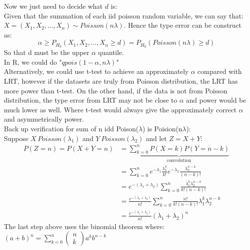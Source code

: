 \documentclass[12pt ]{article}
\newcommand{\RomanNumeralCaps}[1] {\MakeUppercase{\romannumeral #1}}
\begin{document}
\noindent
Now we just need to decide what $d$ is: \\
Given that the summation of each iid poisson random variable, we can say that: $X = (X_{1}, X_{2}, \ldots, X_{n}) \sim Poisson(n\lambda)$. Hence the type \RomanNumeralCaps{1} error can be construct as:
\begin{equation*}
\alpha \geq P_{H_{0}}(X_{1}, X_{2}, \ldots, X_{n} \geq d) = P_{H_{0}}(Poisson(n\lambda) \geq d)
\end{equation*}
So that d must be the upper $\alpha$ quantile.\\
In R, we could do "$ qpois (1-\alpha, n\lambda)$"\\

Alternatively, we could use t-test to achieve an approximately $\alpha$ compared with LRT, however if the datasets are truly from Poisson distribution, the LRT has more power than t-test. On the other hand, if the data is not from Poisson distribution, the type \RomanNumeralCaps{1} error from LRT may not be close to $\alpha$ and power would be much lower as well. Where t-test would always give the approximately correct $\alpha$ and asymmetrically power. \\

\color{blue}
Back up verification for sum of n idd Poison($\lambda$) is Poision(n$\lambda$): \\
Suppose $X~Poisson(\lambda_{1})$ and $Y~Poisson(\lambda_{2})$ and let $Z=X+Y$: \\
\begin{align*}
P(Z=n) = P(X+Y=n) &= \underbrace{\sum_{k=0}^{n}P(X=k)P(Y=n-k)}_{\text{convolution}} \\
&= \sum_{k=0}^{n} e^{-\lambda_{1}} \frac{\lambda_{1}^{k}}{k!} e^{-\lambda_{2}} \frac{\lambda_{2}^{n-k}}{(n-k)!} \\
&= e^{-(\lambda_{1} + \lambda_{2})} \sum_{k=0}^{n} \frac{\lambda_{1}^{k} \lambda_{2}^{n-k}}{k!(n-k)!} \\
&= \frac{e^{-(\lambda_{1} + \lambda_{2})}}{n!} \sum_{k=0}^{n} \frac{n!}{k!(n-k)!} \lambda_{1}^{k} \lambda_{2}^{n-k} \\
&= \frac{e^{-(\lambda_{1} + \lambda_{2})}}{n!} (\lambda_{1} + \lambda_{2})^n
\end{align*}
The last step above uses the binomial theorem where: $(a + b)^n = \sum_{k=0}^{n} \left(\begin{array}{c} n \\ k \end{array}\right) a^k b^{n-k}$
\color{black}
\end{document}
